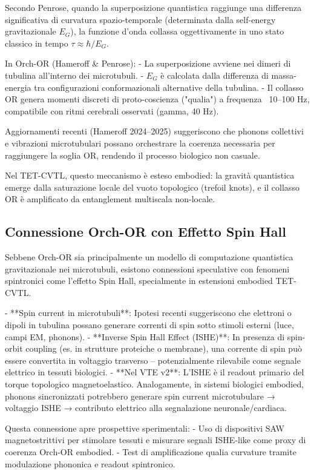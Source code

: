 \documentclass[11pt,a4paper]{article}
\begin{document}
Secondo Penrose, quando la superposizione quantistica raggiunge una differenza significativa di curvatura spazio-temporale (determinata dalla self-energy gravitazionale $E_G$), la funzione d'onda collassa oggettivamente in uno stato classico in tempo $\tau \approx \hbar / E_G$.

In Orch-OR (Hameroff \& Penrose):
- La superposizione avviene nei dimeri di tubulina all'interno dei microtubuli.
- $E_G$ è calcolata dalla differenza di massa-energia tra configurazioni conformazionali alternative della tubulina.
- Il collasso OR genera momenti discreti di proto-coscienza ("qualia") a frequenza ~10–100 Hz, compatibile con ritmi cerebrali osservati (gamma, 40 Hz).

Aggiornamenti recenti (Hameroff 2024–2025) suggeriscono che phonons collettivi e vibrazioni microtubulari possano orchestrare la coerenza necessaria per raggiungere la soglia OR, rendendo il processo biologico non casuale.

Nel TET-CVTL, questo meccanismo è esteso embodied: la gravità quantistica emerge dalla saturazione locale del vuoto topologico (trefoil knots), e il collasso OR è amplificato da entanglement multiscala non-locale.

\subsection{Connessione Orch-OR con Effetto Spin Hall}

Sebbene Orch-OR sia principalmente un modello di computazione quantistica gravitazionale nei microtubuli, esistono connessioni speculative con fenomeni spintronici come l'effetto Spin Hall, specialmente in estensioni embodied TET-CVTL.

- **Spin current in microtubuli**: Ipotesi recenti suggeriscono che elettroni o dipoli in tubulina possano generare correnti di spin sotto stimoli esterni (luce, campi EM, phonons).
- **Inverse Spin Hall Effect (ISHE)**: In presenza di spin-orbit coupling (es. in strutture proteiche o membrane), una corrente di spin può essere convertita in voltaggio trasverso – potenzialmente rilevabile come segnale elettrico in tessuti biologici.
- **Nel VTE v2**: L'ISHE è il readout primario del torque topologico magnetoelastico. Analogamente, in sistemi biologici embodied, phonons sincronizzati potrebbero generare spin current microtubulare → voltaggio ISHE → contributo elettrico alla segnalazione neuronale/cardiaca.

Questa connessione apre prospettive sperimentali:
- Uso di dispositivi SAW magnetostrittivi per stimolare tessuti e misurare segnali ISHE-like come proxy di coerenza Orch-OR embodied.
- Test di amplificazione qualia curvature tramite modulazione phononica e readout spintronico.
\end{document}
